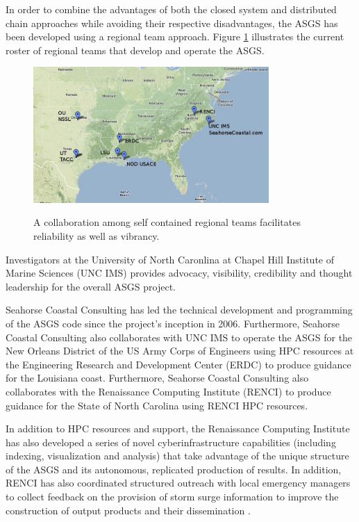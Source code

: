 \documentclass[jmse,article,submit,moreauthors,pdftex,12pt,a4paper]{mdpi}
\begin{document}
In order to combine the advantages of both the closed system and 
distributed chain approaches while avoiding their respective 
disadvantages, the ASGS has been developed using a regional team 
approach. Figure \ref{fig:regional_teams} illustrates the current 
roster of regional teams that develop and operate the ASGS. 

\begin{figure}[t]
  \centering
  \includegraphics[width=0.8\textwidth]{regional_teams}\\
  \caption{A collaboration among self contained regional teams facilitates reliability as well as vibrancy.}
  \label{fig:regional_teams}
\end{figure}

Investigators at the University of North Caronlina at Chapel Hill 
Institute of Marine Sciences (UNC IMS) provides advocacy, visibility, 
credibility and thought leadership for the overall ASGS project. 

Seahorse Coastal Consulting has led the technical development and 
programming of the ASGS code since the project's inception in 2006. 
Furthermore, Seahorse Coastal Consulting also collaborates with UNC 
IMS to operate the ASGS for the New Orleans District of the US Army 
Corps of Engineers using HPC resources at the Engineering Research 
and Development Center (ERDC) to produce guidance for the Louisiana 
coast. Furthermore, Seahorse Coastal Consulting also collaborates with 
the Renaissance Computing Institute (RENCI) to produce guidance for 
the State of North Carolina using RENCI HPC resources. 

In addition to HPC resources and support, the Renaissance Computing 
Institute has also developed a series of novel cyberinfrastructure 
capabilities (including indexing, visualization and analysis) \cite 
{BlantonBO2012} that take advantage of the unique structure of the 
ASGS and its autonomous, replicated production of results. In 
addition, RENCI has also coordinated structured outreach with local 
emergency managers to collect feedback on the provision of storm 
surge information to improve the construction of output products and 
their dissemination \cite {LosegoJL2012}. 
\end{document}
